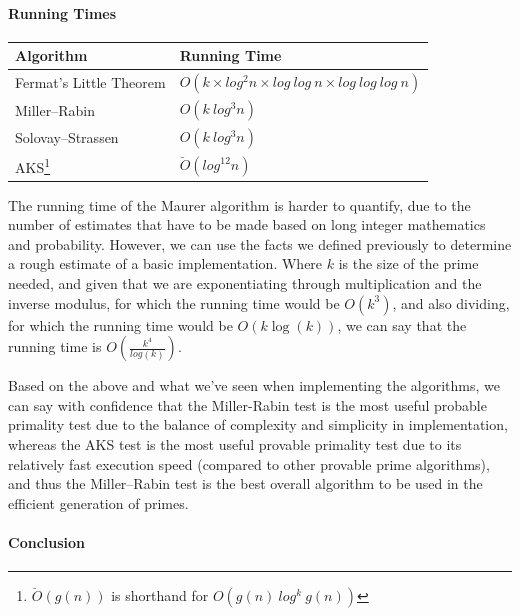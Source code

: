      \paragraph{Running Times}
      
      \begin{center}
        \begin{tabular}{ | l | l |}
          \hline
          \textbf{Algorithm} & \textbf{Running Time}  \\ \hline
          Fermat's Little Theorem & $O(k \times log^2n \times log \ log \ n \times log \ log \ log \ n)$ \\ \hline
          Miller--Rabin & $O(k \ log^3n)$ \\ \hline
          Solovay--Strassen & $O(k \ log^3n)$ \\ \hline
          AKS\footnote{$\breve{O}(g(n))$ is shorthand for $O(g(n) \ log^k \ g(n))$} & $\breve{O}(log^{12}n)$ \\ \hline
        \end{tabular}
      \end{center}
      
      The running time of the Maurer algorithm is harder to quantify, due to the number of estimates that have to be made based on long integer mathematics and probability. However, we can use the facts we defined previously to determine a rough estimate of a basic implementation. Where $k$ is the size of the prime needed, and given that we are exponentiating through multiplication and the inverse modulus, for which the running time would be $O(k^3)$, and also dividing, for which the running time would be $O(k\log(k))$, we can say that the running time is $O(\frac{k^4}{log(k)})$\cite{Schwarz:2007aa}.
      
    Based on the above and what we've seen when implementing the algorithms, we can say with confidence that the Miller-Rabin test is the most useful probable primality test due to the balance of complexity  and simplicity in implementation, whereas the AKS test is the most useful provable primality test due to its relatively fast execution speed (compared to other provable prime algorithms), and thus the Miller--Rabin test is the best overall algorithm to be used in the efficient generation of primes.
    
      \paragraph{Conclusion}
      
